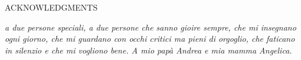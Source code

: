 
ACKNOWLEDGMENTS

\vspace*{5\baselineskip}

\begin{flushright}
    \textit{a due persone speciali, a due persone che sanno gioire sempre, che mi insegnano ogni giorno, che mi guardano con occhi critici ma pieni di orgoglio, che faticano in silenzio e che mi vogliono bene. A mio papà Andrea e mia mamma Angelica.}
\end{flushright}
